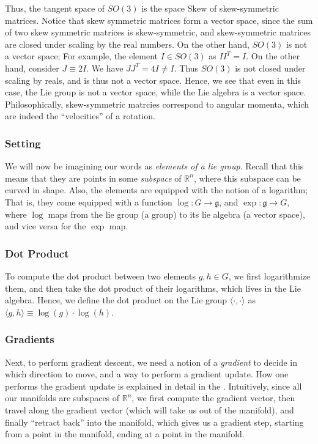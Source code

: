 \documentclass[11pt]{book}
\newcommand{\skewsym}{\mathrm{Skew}}
\begin{document}
Thus, the tangent space of $SO(3)$ is the space $\skewsym$ of skew-symmetric matrices. Notice that skew symmetric
matrices form a vector space, since the sum of two skew symmetric matrices is skew-symmetric, and skew-symmetric
matrices are closed under scaling by the real numbers. On the other hand, $SO(3)$ is not a vector space; For example,
the element $I \in SO(3)$ as $I I^T = I$. On the other hand, consider $J \equiv 2I$. We have
$J J^T = 4I \neq I$. Thus $SO(3)$ is not closed under scaling by reals, and is thus not a vector space. Hence,
we see that even in this case, the Lie group is not a vector space, while the Lie algebra is a vector space.
Philosophically, skew-symmetric matrcies correspond to angular momenta, which are indeed the ``velocities''
of a rotation.


\subsubsection{Setting} We will now be imagining our words as \emph{elements of a lie group}. Recall that this means that
they are points in some \emph{subspace} of $\mathbb R^n$, where this subspace can be curved in shape.
Also, the elements are equipped with the notion of a logarithm; That is, they come equipped with a
function $\log : G \rightarrow \mathfrak g$, and $\exp: \mathfrak g \rightarrow G$,
where $\log$ maps from the lie group (a group) to its lie algebra (a vector space),
and vice versa for the $\exp$ map.


\subsubsection{Dot Product}  To compute the dot product between two elements $g, h \in G$, we first logarithmize
them, and then take the dot product of their logarithms, which lives in the Lie algebra.
Hence, we define the dot product on the Lie group $\langle \cdot , \cdot \rangle$ as
$\langle g, h \rangle \equiv \log(g) \cdot \log(h)$.


\subsubsection{Gradients} Next, to perform gradient descent, we need
a notion of a \emph{gradient} to decide in which direction to move, and a way to perform a gradient update.
How one performs the gradient update is explained in detail in the \label{section:optim-on-riem}. Intuitively,
since all our manifolds are subspaces of $\mathbb R^n$, we first compute the gradient vector, then travel
along the gradient vector (which will take us out of the manifold), and finally ``retract back'' into the
manifold, which gives us a gradient step, starting from a point in the manifold, ending at a point in the manifold.
\end{document}
